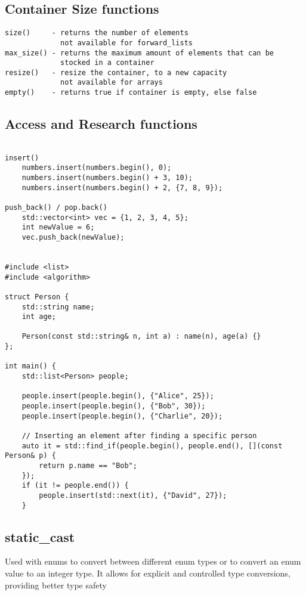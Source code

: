 \documentclass[openany]{report}
\begin{document}
\subsection{Container Size functions}

\begin{verbatim}
size()     - returns the number of elements
             not available for forward_lists
max_size() - returns the maximum amount of elements that can be
             stocked in a container
resize()   - resize the container, to a new capacity
             not available for arrays
empty()    - returns true if container is empty, else false
\end{verbatim}

\subsection{Access and Research functions}

\begin{verbatim}

insert()
    numbers.insert(numbers.begin(), 0); 
    numbers.insert(numbers.begin() + 3, 10);
    numbers.insert(numbers.begin() + 2, {7, 8, 9});

push_back() / pop.back()
    std::vector<int> vec = {1, 2, 3, 4, 5};
    int newValue = 6;
    vec.push_back(newValue);


#include <list>
#include <algorithm>

struct Person {
    std::string name;
    int age;

    Person(const std::string& n, int a) : name(n), age(a) {}
};

int main() {
    std::list<Person> people;

    people.insert(people.begin(), {"Alice", 25});
    people.insert(people.begin(), {"Bob", 30});
    people.insert(people.begin(), {"Charlie", 20});

    // Inserting an element after finding a specific person
    auto it = std::find_if(people.begin(), people.end(), [](const Person& p) {
        return p.name == "Bob";
    });
    if (it != people.end()) {
        people.insert(std::next(it), {"David", 27});
    }
\end{verbatim}

\subsection{static\_cast}

Used with enums to convert between different enum types or to convert an enum value to an integer type.
It allows for explicit and controlled type conversions, providing better type safety
\end{document}
